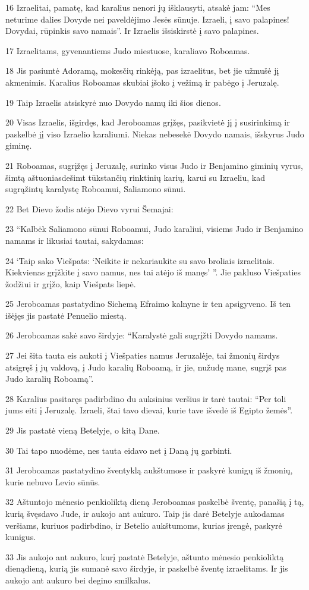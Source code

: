 \par 16 Izraelitai, pamatę, kad karalius nenori jų išklausyti, atsakė jam: “Mes neturime dalies Dovyde nei paveldėjimo Jesės sūnuje. Izraeli, į savo palapines! Dovydai, rūpinkis savo namais”. Ir Izraelis išsiskirstė į savo palapines. 
\par 17 Izraelitams, gyvenantiems Judo miestuose, karaliavo Roboamas. 
\par 18 Jis pasiuntė Adoramą, mokesčių rinkėją, pas izraelitus, bet jie užmušė jį akmenimis. Karalius Roboamas skubiai įšoko į vežimą ir pabėgo į Jeruzalę. 
\par 19 Taip Izraelis atsiskyrė nuo Dovydo namų iki šios dienos. 
\par 20 Visas Izraelis, išgirdęs, kad Jeroboamas grįžęs, pasikvietė jį į susirinkimą ir paskelbė jį viso Izraelio karaliumi. Niekas nebesekė Dovydo namais, išskyrus Judo giminę. 
\par 21 Roboamas, sugrįžęs į Jeruzalę, surinko visus Judo ir Benjamino giminių vyrus, šimtą aštuoniasdešimt tūkstančių rinktinių karių, karui su Izraeliu, kad sugrąžintų karalystę Roboamui, Saliamono sūnui. 
\par 22 Bet Dievo žodis atėjo Dievo vyrui Šemajai: 
\par 23 “Kalbėk Saliamono sūnui Roboamui, Judo karaliui, visiems Judo ir Benjamino namams ir likusiai tautai, sakydamas: 
\par 24 ‘Taip sako Viešpats: ‘Neikite ir nekariaukite su savo broliais izraelitais. Kiekvienas grįžkite į savo namus, nes tai atėjo iš manęs’ ”. Jie pakluso Viešpaties žodžiui ir grįžo, kaip Viešpats liepė. 
\par 25 Jeroboamas pastatydino Sichemą Efraimo kalnyne ir ten apsigyveno. Iš ten išėjęs jis pastatė Penuelio miestą. 
\par 26 Jeroboamas sakė savo širdyje: “Karalystė gali sugrįžti Dovydo namams. 
\par 27 Jei šita tauta eis aukoti į Viešpaties namus Jeruzalėje, tai žmonių širdys atsigręš į jų valdovą, į Judo karalių Roboamą, ir jie, nužudę mane, sugrįš pas Judo karalių Roboamą”. 
\par 28 Karalius pasitaręs padirbdino du auksinius veršius ir tarė tautai: “Per toli jums eiti į Jeruzalę. Izraeli, štai tavo dievai, kurie tave išvedė iš Egipto žemės”. 
\par 29 Jis pastatė vieną Betelyje, o kitą­ Dane. 
\par 30 Tai tapo nuodėme, nes tauta eidavo net į Daną jų garbinti. 
\par 31 Jeroboamas pastatydino šventyklą aukštumose ir paskyrė kunigų iš žmonių, kurie nebuvo Levio sūnūs. 
\par 32 Aštuntojo mėnesio penkioliktą dieną Jeroboamas paskelbė šventę, panašią į tą, kurią švęsdavo Jude, ir aukojo ant aukuro. Taip jis darė Betelyje aukodamas veršiams, kuriuos padirbdino, ir Betelio aukštumoms, kurias įrengė, paskyrė kunigus. 
\par 33 Jis aukojo ant aukuro, kurį pastatė Betelyje, aštunto mėnesio penkioliktą dieną­dieną, kurią jis sumanė savo širdyje, ir paskelbė šventę izraelitams. Ir jis aukojo ant aukuro bei degino smilkalus.



